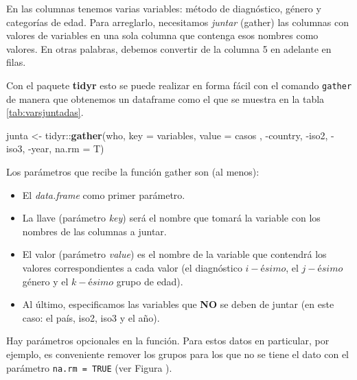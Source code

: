 \documentclass[]{article}
\newenvironment{Shaded}{\begin{snugshade}}{\end{snugshade}}
\newcommand{\KeywordTok}[1]{\textcolor[rgb]{0.13,0.29,0.53}{\textbf{{#1}}}}
\newcommand{\DataTypeTok}[1]{\textcolor[rgb]{0.13,0.29,0.53}{{#1}}}
\newcommand{\StringTok}[1]{\textcolor[rgb]{0.31,0.60,0.02}{{#1}}}
\newcommand{\NormalTok}[1]{{#1}}
\providecommand{\tightlist}{%
  \setlength{\itemsep}{0pt}\setlength{\parskip}{0pt}}
\begin{document}
En las columnas tenemos varias variables: método de diagnóstico, género
y categorías de edad. Para arreglarlo, necesitamos \emph{juntar}
(gather) las columnas con valores de variables en una sola columna que
contenga esos nombres como valores. En otras palabras, debemos convertir
de la columna 5 en adelante en filas.

Con el paquete \textbf{tidyr} esto se puede realizar en forma fácil con
el comando \texttt{gather} de manera que obtenemos un dataframe como el
que se muestra en la tabla \ref{tab:varsjuntadas}.

\begin{Shaded}
\begin{Highlighting}[]
\NormalTok{junta <-}\StringTok{ }\NormalTok{tidyr::}\KeywordTok{gather}\NormalTok{(who, }\DataTypeTok{key =} \NormalTok{variables, }\DataTypeTok{value =} \NormalTok{casos}
                       \NormalTok{, -country, -iso2, -iso3, -year, }\DataTypeTok{na.rm =} \NormalTok{T)}
\end{Highlighting}
\end{Shaded}

Los parámetros que recibe la función gather son (al menos):

\begin{itemize}
\tightlist
\item
  El \emph{data.frame} como primer parámetro.
\item
  La llave (parámetro \emph{key}) será el nombre que tomará la variable
  con los nombres de las columnas a juntar.
\item
  El valor (parámetro \emph{value}) es el nombre de la variable que
  contendrá los valores correspondientes a cada valor (el diagnóstico
  \(i-ésimo\), el \(j-ésimo\) género y el \(k-ésimo\) grupo de edad).
\item
  Al último, especificamos las variables que \textbf{NO} se deben de
  juntar (en este caso: el país, iso2, iso3 y el año).
\end{itemize}

Hay parámetros opcionales en la función. Para estos datos en particular,
por ejemplo, es conveniente remover los grupos para los que no se tiene
el dato con el parámetro \texttt{na.rm\ =\ TRUE} (ver Figura ).
\end{document}
